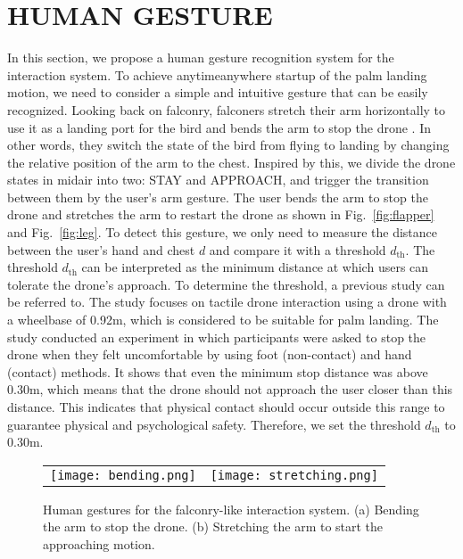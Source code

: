 \section{HUMAN GESTURE}
\label{sec:gesture}

In this section, we propose a human gesture recognition system for the interaction system.
To achieve anytime{\-}anywhere startup of the palm landing motion, we need to consider a simple and intuitive gesture that can be easily recognized.
Looking back on falconry, falconers stretch their arm horizontally to use it as a landing port for the bird and bends the arm to stop the drone .
In other words, they switch the state of the bird from flying to landing by changing the relative position of the arm to the chest.
Inspired by this, we divide the drone states in midair into two: STAY and APPROACH,
and trigger the transition between them by the user's arm gesture.
The user bends the arm to stop the drone and stretches the arm to restart the drone as shown in Fig.~\ref{fig:flapper} and Fig.~\ref{fig:leg}.
To detect this gesture, we only need to measure the distance between the user's hand and chest $d$ and compare it with a threshold $d_{\text{th}}$.
The threshold $d_{\text{th}}$ can be interpreted as the minimum distance at which users can tolerate the drone's approach.
To determine the threshold, a previous study \cite{lieser2021evaluating-distances} can be referred to.
The study focuses on tactile drone interaction using a drone with a wheelbase of 0.92m, which is considered to be suitable for palm landing.
The study conducted an experiment in which participants were asked to stop the drone when they felt uncomfortable by using foot (non-contact) and hand (contact) methods.
It shows that even the minimum stop distance was above 0.30m, 
which means that the drone should not approach the user closer than this distance.
This indicates that physical contact should occur outside this range to guarantee physical and psychological safety.
Therefore, we set the threshold $d_{\text{th}}$ to 0.30m.

\begin{figure}
    \centering
    \begin{tabular}{cc}
        \begin{minipage}[t]{0.34 \columnwidth}
          \centering
          \texttt{[image: bending.png]}
          \subcaption{}
          \label{fig:flapper}
        \end{minipage} &
        \begin{minipage}[t]{0.48 \columnwidth}
          \centering
          \texttt{[image: stretching.png]}
          \subcaption{}
          \label{fig:leg}
        \end{minipage}
      \end{tabular}
    \caption{Human gestures for the falconry-like interaction system. (a) Bending the arm to stop the drone. (b) Stretching the arm to start the approaching motion.}
    \label{fig:gesture}
  \end{figure}
